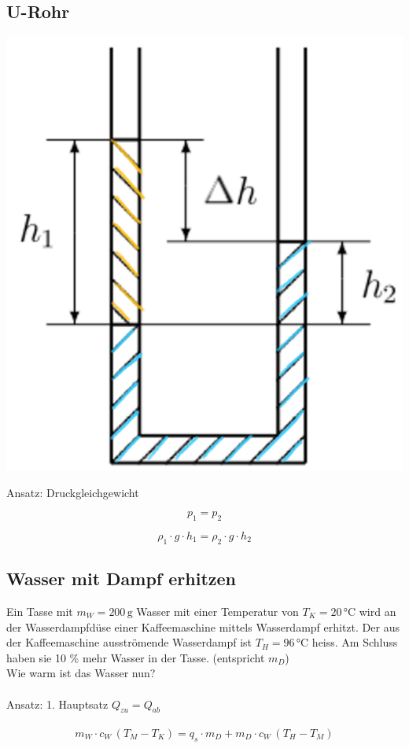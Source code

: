 \subsection{U-Rohr}

\begin{minipage}{0.4\linewidth}
\includegraphics[width=\linewidth]{Bilder/u-rohr} \\
\end{minipage}
\hfill
\begin{minipage}{0.55\linewidth}
Ansatz: Druckgleichgewicht 

$$ p_1 = p_2 $$

$$ \rho_1 \cdot g \cdot h_1 = \rho_2 \cdot g \cdot h_2  $$
\end{minipage}


\subsection{Wasser mit Dampf erhitzen}

Ein Tasse mit $m_W = 200 \, \mathrm{g}$ Wasser  mit einer Temperatur von $T_K = 20 \, \text{°C}$ wird an
der Wasserdampfdüse einer Kaffeemaschine mittels Wasserdampf erhitzt. Der aus der
Kaffeemaschine ausströmende Wasserdampf ist $T_H = 96 \, \text{°C}$ heiss. Am Schluss haben sie 10 \%
mehr Wasser in der Tasse. (entspricht $m_D$)\\
Wie warm ist das Wasser nun? \\
\\
Ansatz: 1. Hauptsatz \quad $Q_{zu} = Q_{ab}$ \\
\\
$$ m_W \cdot c_W \, (T_M - T_K) = q_s \cdot m_D + m_D \cdot c_W \, (T_H - T_M) $$



